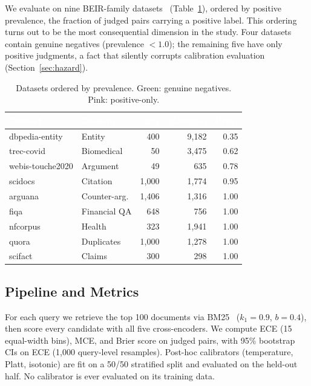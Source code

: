 \documentclass[conference]{IEEEtran}
\newcommand{\thead}[1]{\textcolor{white}{\textbf{#1}}}
\begin{document}
We evaluate on nine BEIR-family datasets~\cite{thakur2021beir}
(Table~\ref{tab:datasets}), ordered by positive prevalence, the fraction of
judged pairs carrying a positive label. This ordering turns out to be the
most consequential dimension in the study. Four datasets contain genuine
negatives (prevalence $<1.0$); the remaining five have only positive
judgments, a fact that silently corrupts calibration evaluation
(Section~\ref{sec:hazard}).

\begin{table}[t]
\centering
\caption{Datasets ordered by prevalence.
\textcolor{green!50!black}{Green}: genuine negatives.
\textcolor{red!50!black}{Pink}: positive-only.}
\label{tab:datasets}
\scriptsize
\begin{tabular}{llrrr}
\toprule
\rowcolor{headblue}
\thead{Dataset} & \thead{Domain} & \thead{\#Q} & \thead{\#Judged} & \thead{Prev.} \\
\midrule
\rowcolor{cleangreen}
dbpedia-entity   & Entity          & 400   & 9{,}182 & 0.35 \\
\rowcolor{cleangreen}
trec-covid       & Biomedical      & 50    & 3{,}475 & 0.62 \\
\rowcolor{cleangreen}
webis-touche2020 & Argument        & 49    & 635     & 0.78 \\
\rowcolor{cleangreen}
scidocs          & Citation        & 1{,}000 & 1{,}774 & 0.95 \\
\rowcolor{singleclasspink}
arguana          & Counter-arg.    & 1{,}406 & 1{,}316 & 1.00 \\
\rowcolor{singleclasspink}
fiqa             & Financial QA    & 648   & 756     & 1.00 \\
\rowcolor{singleclasspink}
nfcorpus         & Health          & 323   & 1{,}941 & 1.00 \\
\rowcolor{singleclasspink}
quora            & Duplicates      & 1{,}000 & 1{,}278 & 1.00 \\
\rowcolor{singleclasspink}
scifact          & Claims          & 300   & 298     & 1.00 \\
\bottomrule
\end{tabular}
\vspace{-0.3cm}
\end{table}

\subsection{Pipeline and Metrics}

For each query we retrieve the top 100 documents via
BM25~\cite{robertson2009bm25} ($k_1{=}0.9$, $b{=}0.4$), then score every
candidate with all five cross-encoders. We compute ECE (15 equal-width
bins), MCE, and Brier score on judged pairs, with 95\% bootstrap CIs on ECE
(1{,}000 query-level resamples). Post-hoc calibrators (temperature, Platt,
isotonic) are fit on a 50/50 stratified split and evaluated on the held-out
half. No calibrator is ever evaluated on its training data.
\end{document}
